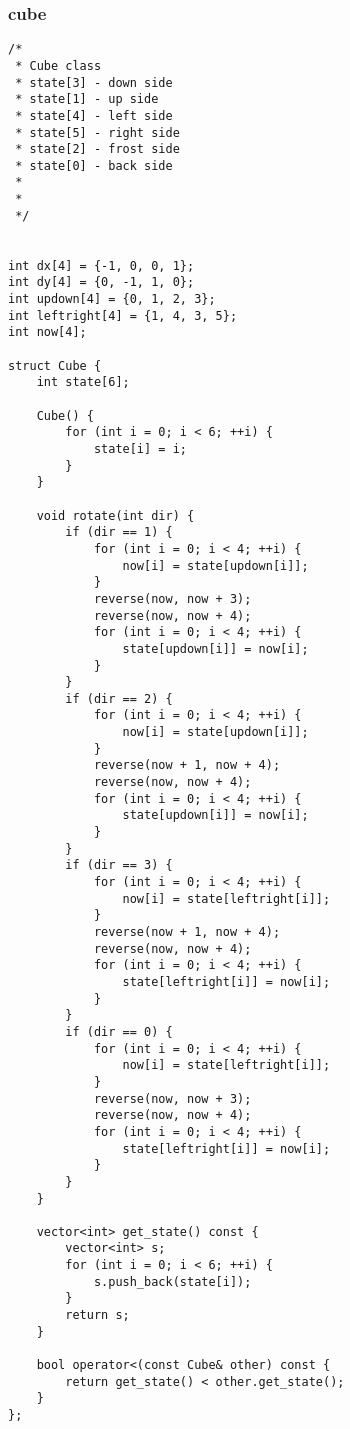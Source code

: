 \subsubsection{cube}
\begin{lstlisting}
/*
 * Cube class
 * state[3] - down side
 * state[1] - up side
 * state[4] - left side
 * state[5] - right side
 * state[2] - frost side
 * state[0] - back side
 *
 *
 */


int dx[4] = {-1, 0, 0, 1};
int dy[4] = {0, -1, 1, 0};
int updown[4] = {0, 1, 2, 3};
int leftright[4] = {1, 4, 3, 5};
int now[4];

struct Cube {
    int state[6];

    Cube() {
        for (int i = 0; i < 6; ++i) {
            state[i] = i;
        }
    }

    void rotate(int dir) {
        if (dir == 1) {
            for (int i = 0; i < 4; ++i) {
                now[i] = state[updown[i]];
            }
            reverse(now, now + 3);
            reverse(now, now + 4);
            for (int i = 0; i < 4; ++i) {
                state[updown[i]] = now[i];
            }
        }
        if (dir == 2) {
            for (int i = 0; i < 4; ++i) {
                now[i] = state[updown[i]];
            }
            reverse(now + 1, now + 4);
            reverse(now, now + 4);
            for (int i = 0; i < 4; ++i) {
                state[updown[i]] = now[i];
            }
        }
        if (dir == 3) {
            for (int i = 0; i < 4; ++i) {
                now[i] = state[leftright[i]];
            }
            reverse(now + 1, now + 4);
            reverse(now, now + 4);
            for (int i = 0; i < 4; ++i) {
                state[leftright[i]] = now[i];
            }
        }
        if (dir == 0) {
            for (int i = 0; i < 4; ++i) {
                now[i] = state[leftright[i]];
            }
            reverse(now, now + 3);
            reverse(now, now + 4);
            for (int i = 0; i < 4; ++i) {
                state[leftright[i]] = now[i];
            }
        }
    }
    
    vector<int> get_state() const {
        vector<int> s;
        for (int i = 0; i < 6; ++i) {
            s.push_back(state[i]);
        }
        return s;
    }

    bool operator<(const Cube& other) const {
        return get_state() < other.get_state();
    }
};

\end{lstlisting}

